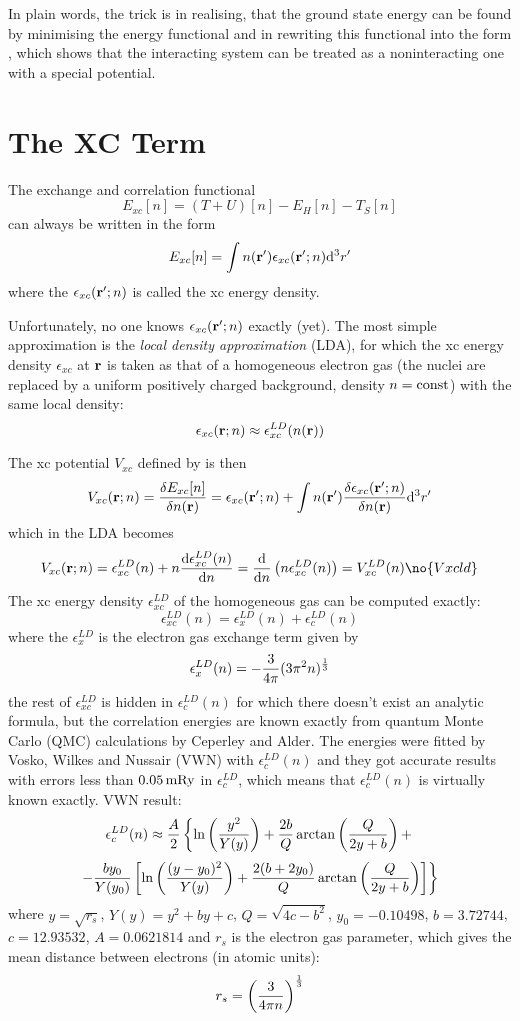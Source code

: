 In plain words, the trick is in realising, that the ground state energy can be
found by minimising the energy functional  and in rewriting this
functional into the form , which shows that the interacting
system can be treated as a noninteracting one with a special potential.

\section{The XC Term}

The exchange and correlation functional
$$E_{xc}[n]=(T+U)[n]-E_H[n]-T_S[n]$$
can always be written in the form
$$E_{xc}[n]=\int n({\bf r}')\epsilon_{xc}({\bf r}';n){\rm d}^3r'$$
where the $\epsilon_{xc}({\bf r}';n)$ is called the xc energy density. 

Unfortunately, no one knows $\epsilon_{xc}({\bf r}';n)$ exactly (yet).  The
most simple approximation is the {\it local density approximation \/} (LDA),
for which the xc energy density $\epsilon_{xc}$ at $\bf r$ is taken as that of
a homogeneous electron gas (the nuclei are replaced by a uniform positively
charged background, density $n=\rm const$) with the same local density:
$$\epsilon_{xc}({\bf r};n)\approx\epsilon_{xc}^{LD}(n({\bf r}))$$

The xc potential $V_{xc}$ defined by  is then
$$V_{xc}({\bf r};n)={\delta E_{xc}[n]\over\delta n({\bf r})}=
\epsilon_{xc}({\bf r}';n)+
\int n({\bf r}'){\delta \epsilon_{xc}({\bf r}';n)\over\delta n({\bf r})}{\rm d}^3r'
$$
which in the LDA becomes
$$V_{xc}({\bf r};n)
=\epsilon_{xc}^{LD}(n)+n{\d \epsilon_{xc}^{LD}(n)\over \d n}=
{\d \over \d n}\left(n\epsilon_{xc}^{LD}(n)\right)=
V_{xc}^{LD}(n)
\no{Vxcld}$$
The xc energy density $\epsilon_{xc}^{LD}$ of the homogeneous gas can be
computed exactly\cite{martin}: 
$$\epsilon_{xc}^{LD}(n)=\epsilon_x^{LD}(n)+\epsilon_c^{LD}(n)$$
where the $\epsilon_x^{LD}$ is the electron gas exchange term given
by\cite{martin}
$$\epsilon_x^{LD}(n)=-{3\over4\pi}(3\pi^2 n)^{1\over3}$$
the rest of $\epsilon_{xc}^{LD}$ is hidden in $\epsilon_c^{LD}(n)$ for which
there doesn't exist an analytic formula, but the correlation energies are known
exactly from quantum Monte Carlo (QMC) calculations by Ceperley and
Alder\cite{pickett}. The energies were fitted by
Vosko, Wilkes and Nussair (VWN) with
$\epsilon_c^{LD}(n)$ and they got accurate results with errors less than
$0.05\rm\,mRy$ in $\epsilon_c^{LD}$, which means that $\epsilon_c^{LD}(n)$ is
virtually known exactly. VWN result:
$$\epsilon_c^{LD}(n)\approx {A\over2}\left\{
\ln\left(y^2\over Y(y)\right)+{2b\over Q}\arctan\left(Q\over 2y+b\right)+
\right.
$$
$$\left.
-{by_0\over Y(y_0)}\left[\ln\left((y-y_0)^2\over Y(y)\right)
+{2(b+2y_0)\over Q}\arctan\left(Q\over 2y+b\right)
\right] \right\}$$
where $y=\sqrt{r_s}$, $Y(y)=y^2+by+c$, $Q=\sqrt{4c-b^2}$, $y_0=-0.10498$,
$b=3.72744$, $c=12.93532$, $A=0.0621814$ and $r_s$ is the electron gas
parameter, which gives the mean distance between electrons (in atomic units):
$$r_s=\left(3\over4\pi n\right)^{1\over3}$$

